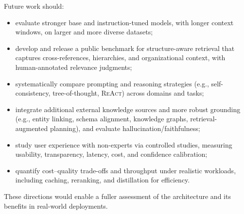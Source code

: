 Future work should:
\begin{itemize}
	\item evaluate stronger base and instruction-tuned models, with longer context windows, on larger and more diverse datasets;
	\item develop and release a public benchmark for structure-aware retrieval that captures cross-references, hierarchies, and organizational context, with human-annotated relevance judgments;
	\item systematically compare prompting and reasoning strategies (e.g., self-consistency, tree-of-thought, \textsc{ReAct}) across domains and tasks;
	\item integrate additional external knowledge sources and more robust grounding (e.g., entity linking, schema alignment, knowledge graphs, retrieval-augmented planning), and evaluate hallucination/faithfulness;
	\item study user experience with non-experts via controlled studies, measuring usability, transparency, latency, cost, and confidence calibration;
	\item quantify cost–quality trade-offs and throughput under realistic workloads, including caching, reranking, and distillation for efficiency.
\end{itemize}

These directions would enable a fuller assessment of the architecture and its benefits in real-world deployments.



